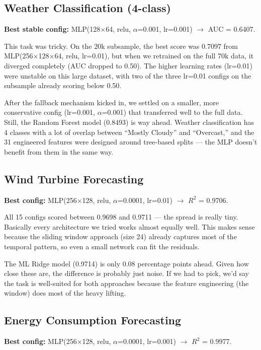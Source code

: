 \documentclass[11pt,a4paper]{article}
\begin{document}
\subsection{Weather Classification (4-class)}

\textbf{Best stable config:} MLP(128$\times$64, relu, $\alpha$=0.001, lr=0.001) $\rightarrow$ AUC = 0.6407.

This task was tricky. On the 20k subsample, the best score was 0.7097 from MLP(256$\times$128$\times$64, relu, lr=0.01), but when we retrained on the full 70k data, it diverged completely (AUC dropped to 0.50). The higher learning rates (lr=0.01) were unstable on this large dataset, with two of the three lr=0.01 configs on the subsample already scoring below 0.50.

After the fallback mechanism kicked in, we settled on a smaller, more conservative config (lr=0.001, $\alpha$=0.001) that transferred well to the full data. Still, the Random Forest model (0.8493) is way ahead. Weather classification has 4 classes with a lot of overlap between ``Mostly Cloudy'' and ``Overcast,'' and the 31 engineered features were designed around tree-based splits --- the MLP doesn't benefit from them in the same way.

\subsection{Wind Turbine Forecasting}

\textbf{Best config:} MLP(256$\times$128, relu, $\alpha$=0.0001, lr=0.01) $\rightarrow$ $R^2$ = 0.9706.

All 15 configs scored between 0.9698 and 0.9711 --- the spread is really tiny. Basically every architecture we tried works almost equally well. This makes sense because the sliding window approach (size 24) already captures most of the temporal pattern, so even a small network can fit the residuals.

The ML Ridge model (0.9714) is only 0.08 percentage points ahead. Given how close these are, the difference is probably just noise. If we had to pick, we'd say the task is well-suited for both approaches because the feature engineering (the window) does most of the heavy lifting.

\subsection{Energy Consumption Forecasting}

\textbf{Best config:} MLP(256$\times$128, relu, $\alpha$=0.0001, lr=0.001) $\rightarrow$ $R^2$ = 0.9977.
\end{document}
